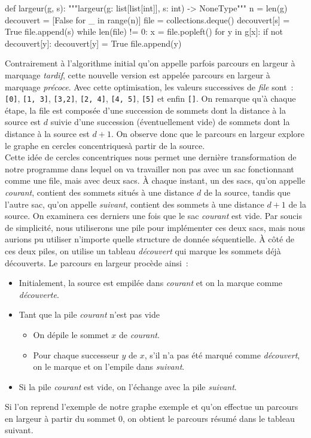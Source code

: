 \documentclass{magnolia}
\begin{document}
\begin{pythoncodeline}
def largeur(g, s):
    """largeur(g: list[list[int]], s: int) -> NoneType"""
    n = len(g)
    decouvert = [False for _ in range(n)]
    file = collections.deque()
    decouvert[s] = True
    file.append(s)
    while len(file) != 0:
        x = file.popleft()
        for y in g[x]:
            if not decouvert[y]:
                decouvert[y] = True
                file.append(y)
\end{pythoncodeline}
\noindent
Contrairement à l'algorithme initial qu'on appelle parfois parcours en largeur à
marquage \emph{tardif}, cette nouvelle version est appelée parcours en largeur
à marquage \emph{précoce}. Avec cette optimisation, les valeurs successives de
\emph{file} sont~: \verb![0]!, \verb![1, 3]!, \verb![3,2]!, \verb![2, 4]!,
\verb![4, 5]!, \verb![5]! et enfin \verb![]!. On remarque qu'à chaque étape,
la file est composée d'une succession de sommets dont la distance à la source
est $d$ suivie d'une succession (éventuellement vide) de sommets dont la distance à
la source est $d+1$. On observe donc que le parcours en largeur explore le
graphe en \og cercles concentriques\fg à partir de la source.\\

Cette idée de cercles concentriques nous permet une dernière transformation de notre
programme dans lequel on va travailler non pas avec un sac fonctionnant comme une file,
mais avec deux sacs. À chaque instant, un des
sacs, qu'on appelle \emph{courant}, contient des sommets situés à une distance $d$ de
la source, tandis que l'autre sac, qu'on appelle \emph{suivant}, contient des sommets à une
distance $d+1$ de la source. On examinera ces derniers une fois que le sac
\emph{courant} est vide. Par soucis de simplicité, nous utiliserons une pile pour
implémenter ces deux sacs, mais nous aurions pu utiliser n'importe quelle
structure de donnée séquentielle. À côté de ces deux piles, on utilise un tableau \emph{découvert}
qui marque les sommets déjà découverts. Le parcours en largeur procède ainsi~:
\begin{itemize}
\item Initialement, la source est empilée dans \emph{courant} et on la marque comme \emph{découverte}.
\item Tant que la pile \emph{courant} n'est pas vide
\begin{itemize}
  \item On dépile le sommet $x$ de \emph{courant}.
  \item Pour chaque successeur $y$ de $x$, s'il n'a pas été marqué comme \emph{découvert}, on
    le marque et on l'empile dans \emph{suivant}. 
\end{itemize}
\item Si la pile \emph{courant} est vide, on l'échange avec
  la pile \emph{suivant}.
\end{itemize}
Si l'on reprend l'exemple de notre graphe exemple
et qu'on effectue un parcours en largeur à partir du sommet 0, on obtient le parcours
résumé dans le tableau suivant.
\end{document}
